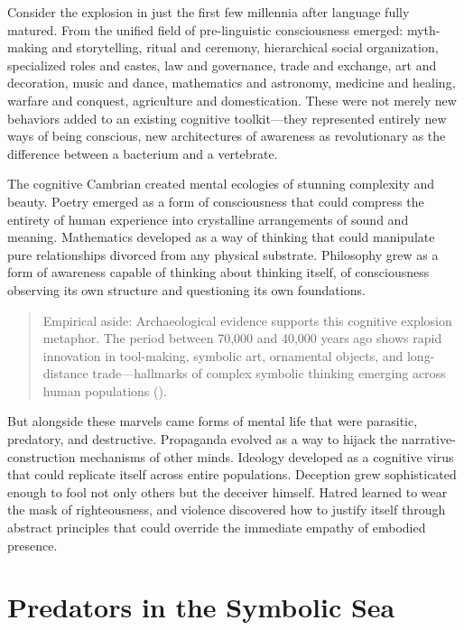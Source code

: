 Consider the explosion in just the first few millennia after language fully matured. From the unified field of pre-linguistic consciousness emerged: myth-making and storytelling, ritual and ceremony, hierarchical social organization, specialized roles and castes, law and governance, trade and exchange, art and decoration, music and dance, mathematics and astronomy, medicine and healing, warfare and conquest, agriculture and domestication. These were not merely new behaviors added to an existing cognitive toolkit—they represented entirely new ways of being conscious, new architectures of awareness as revolutionary as the difference between a bacterium and a vertebrate.

The cognitive Cambrian created mental ecologies of stunning complexity and beauty. Poetry emerged as a form of consciousness that could compress the entirety of human experience into crystalline arrangements of sound and meaning. Mathematics developed as a way of thinking that could manipulate pure relationships divorced from any physical substrate. Philosophy grew as a form of awareness capable of thinking about thinking itself, of consciousness observing its own structure and questioning its own foundations.

\begin{quote}\small
Empirical aside: Archaeological evidence supports this cognitive explosion metaphor. The period between 70,000 and 40,000 years ago shows rapid innovation in tool-making, symbolic art, ornamental objects, and long-distance trade—hallmarks of complex symbolic thinking emerging across human populations (\parencite{mellars2007neanderthal,klein2009birth}).
\end{quote}

But alongside these marvels came forms of mental life that were parasitic, predatory, and destructive. Propaganda evolved as a way to hijack the narrative-construction mechanisms of other minds. Ideology developed as a cognitive virus that could replicate itself across entire populations. Deception grew sophisticated enough to fool not only others but the deceiver himself. Hatred learned to wear the mask of righteousness, and violence discovered how to justify itself through abstract principles that could override the immediate empathy of embodied presence.

\section{Predators in the Symbolic Sea}


